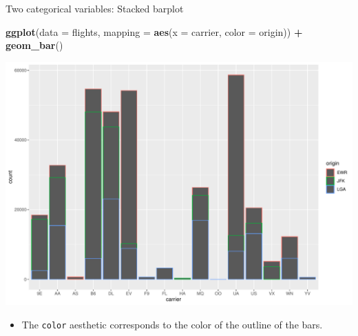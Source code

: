 \documentclass[
  ignorenonframetext,
]{beamer}
\newenvironment{Shaded}{\begin{snugshade}}{\end{snugshade}}
\newcommand{\AttributeTok}[1]{\textcolor[rgb]{0.13,0.29,0.53}{#1}}
\newcommand{\FunctionTok}[1]{\textcolor[rgb]{0.13,0.29,0.53}{\textbf{#1}}}
\newcommand{\NormalTok}[1]{#1}
\newcommand{\SpecialCharTok}[1]{\textcolor[rgb]{0.81,0.36,0.00}{\textbf{#1}}}
\providecommand{\tightlist}{%
  \setlength{\itemsep}{0pt}\setlength{\parskip}{0pt}}
\begin{document}
\begin{frame}[fragile]{Two categorical variables: Stacked barplot}
\protect\hypertarget{two-categorical-variables-stacked-barplot-1}{}
\tiny

\begin{Shaded}
\begin{Highlighting}[]
\FunctionTok{ggplot}\NormalTok{(}\AttributeTok{data =}\NormalTok{ flights, }\AttributeTok{mapping =} \FunctionTok{aes}\NormalTok{(}\AttributeTok{x =}\NormalTok{ carrier, }\AttributeTok{color =}\NormalTok{ origin)) }\SpecialCharTok{+}
  \FunctionTok{geom\_bar}\NormalTok{()}
\end{Highlighting}
\end{Shaded}

\begin{center}\includegraphics[width=0.9\linewidth,height=0.5\textheight]{Week2_Lect_files/figure-beamer/unnamed-chunk-43-1} \end{center}
\normalsize

\begin{itemize}
\tightlist
\item
  The \texttt{color} aesthetic corresponds to the color of the outline
  of the bars.
\end{itemize}
\end{frame}
\end{document}
